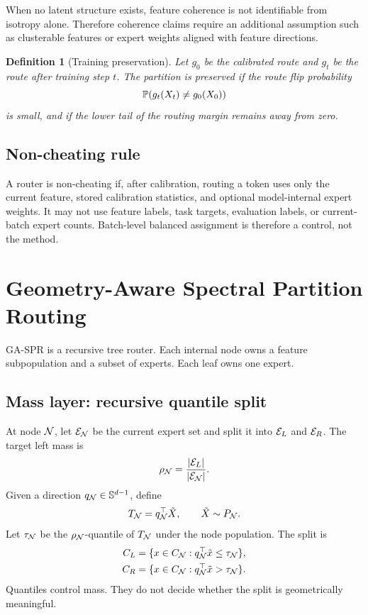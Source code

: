 \documentclass{article}
\newtheorem{definition}{Definition}
\begin{document}
When no latent structure exists, feature coherence is not identifiable from
isotropy alone.  Therefore coherence claims require an additional assumption such
as clusterable features or expert weights aligned with feature directions.

\begin{definition}[Training preservation]
Let $g_0$ be the calibrated route and $g_t$ be the route after training step $t$.
The partition is preserved if the route flip probability
\begin{equation}
  \mathbb{P}(g_t(X_t)\ne g_0(X_0))
\end{equation}
is small, and if the lower tail of the routing margin remains away from zero.
\end{definition}

\subsection{Non-cheating rule}

A router is non-cheating if, after calibration, routing a token uses only the
current feature, stored calibration statistics, and optional model-internal
expert weights.  It may not use feature labels, task targets, evaluation labels,
or current-batch expert counts.  Batch-level balanced assignment is therefore a
control, not the method.

\section{Geometry-Aware Spectral Partition Routing}

GA-SPR is a recursive tree router.  Each internal node owns a feature
subpopulation and a subset of experts.  Each leaf owns one expert.

\subsection{Mass layer: recursive quantile split}

At node $\mathcal{N}$, let $\mathcal{E}_{\mathcal{N}}$ be the current expert set and split it into
$\mathcal{E}_L$ and $\mathcal{E}_R$.  The target left mass is
\begin{equation}
  \rho_{\mathcal{N}}=\frac{|\mathcal{E}_L|}{|\mathcal{E}_{\mathcal{N}}|}.
\end{equation}
Given a direction $q_{\mathcal{N}}\in\mathbb{S}^{d-1}$, define
\begin{equation}
  T_{\mathcal{N}}=q_{\mathcal{N}}^{\top}\tilde X,\qquad \tilde X\sim P_{\mathcal{N}}.
\end{equation}
Let $\tau_{\mathcal{N}}$ be the $\rho_{\mathcal{N}}$-quantile of $T_{\mathcal{N}}$ under the node
population.  The split is
\begin{align}
  C_L&=\{x\in C_{\mathcal{N}}:q_{\mathcal{N}}^{\top}\tilde x\le \tau_{\mathcal{N}}\},\\
  C_R&=\{x\in C_{\mathcal{N}}:q_{\mathcal{N}}^{\top}\tilde x>\tau_{\mathcal{N}}\}.
\end{align}
Quantiles control mass.  They do not decide whether the split is geometrically
meaningful.
\end{document}
